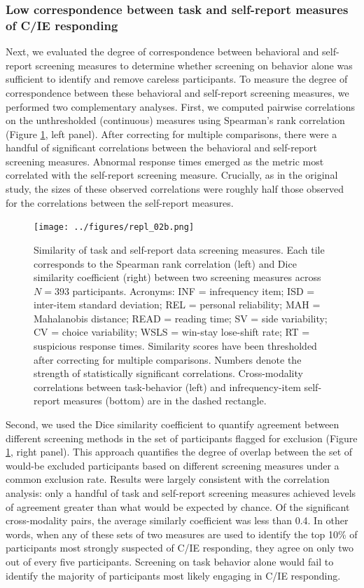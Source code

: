 \documentclass[a4paper,notitlepage,12pt]{article}
\begin{document}
\subsubsection*{Low correspondence between task and self-report measures of C/IE responding}

Next, we evaluated the degree of correspondence between behavioral and self-report screening measures to determine whether screening on behavior alone was sufficient to identify and remove careless participants. To measure the degree of correspondence between these behavioral and self-report screening measures, we performed two complementary analyses. First, we computed pairwise correlations on the unthresholded (continuous) measures using Spearman's rank correlation (Figure \ref{fig:S08}, left panel). After correcting for multiple comparisons, there were a handful of significant correlations between the behavioral and self-report screening measures. Abnormal response times emerged as the metric most correlated with the self-report screening measure. Crucially, as in the original study, the sizes of these observed correlations were roughly half those observed for the correlations between the self-report measures. 

\begin{figure}[!t]
    \texttt{[image: ../figures/repl\_02b.png]}
    \centering
    \caption{Similarity of task and self-report data screening measures. Each tile corresponds to the Spearman rank correlation (left) and Dice similarity coefficient (right) between two screening measures across $N=393$ participants. Acronyms: INF = infrequency item; ISD = inter-item standard deviation; REL = personal reliability; MAH = Mahalanobis distance; READ = reading time; SV = side variability; CV = choice variability; WSLS = win-stay lose-shift rate; RT = suspicious response times. Similarity scores have been thresholded after correcting for multiple comparisons. Numbers denote the strength of statistically significant correlations. Cross-modality correlations between task-behavior (left) and infrequency-item self-report measures (bottom) are in the dashed rectangle.}
    \label{fig:S08}
\end{figure}

Second, we used the Dice similarity coefficient to quantify agreement between different screening methods in the set of participants flagged for exclusion (Figure \ref{fig:S08}, right panel). This approach quantifies the degree of overlap between the set of would-be excluded participants based on different screening measures under a common exclusion rate. Results were largely consistent with the correlation analysis: only a handful of task and self-report screening measures achieved levels of agreement greater than what would be expected by chance. Of the significant cross-modality pairs, the average similarly coefficient was less than 0.4. In other words, when any of these sets of two measures are used to identify the top 10\% of participants most strongly suspected of C/IE responding, they agree on only two out of every five participants. Screening on task behavior alone would fail to identify the majority of participants most likely engaging in C/IE responding.
\end{document}

